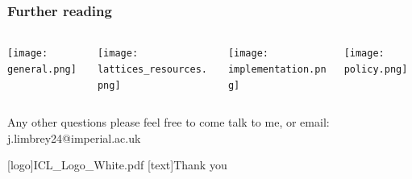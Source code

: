 \documentclass[
aspectratio=169, %
t, %
onlytextwidth, %
10pt, %
]{beamer}
\begin{document}
\begin{frame}
    \frametitle{Further reading}
    \begin{columns}[T] %
        \begin{column}{0.25\linewidth} %
            \texttt{[image: general.png]}
        \end{column}
        \begin{column}{0.25\linewidth} %
            \texttt{[image: lattices\_resources.png]}
        \end{column}
        \begin{column}{0.25\linewidth} %
            \texttt{[image: implementation.png]}
        \end{column}
        \begin{column}{0.25\linewidth} %
            \texttt{[image: policy.png]}
        \end{column}
    \end{columns}
    
    \begin{center}
        Any other questions please feel free to come talk to me, or email: j.limbrey24@imperial.ac.uk
    \end{center}
\end{frame}


\begingroup
	[logo]{ICL_Logo_White.pdf} %
	[text]{Thank you} %
	
\endgroup

\end{document}
